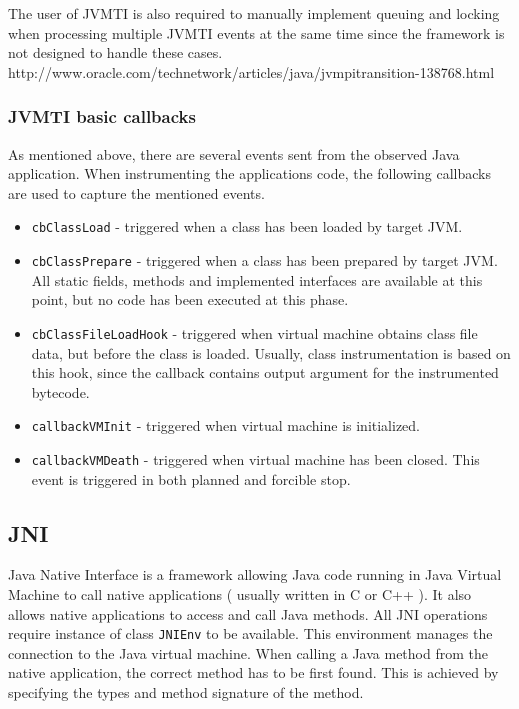 The user of JVMTI is also required to manually implement queuing and locking when processing multiple JVMTI events at the same time since the framework is not designed to handle these cases. http://www.oracle.com/technetwork/articles/java/jvmpitransition-138768.html
\subsubsection{JVMTI basic callbacks}
As mentioned above, there are several events sent from the observed Java application. When instrumenting the applications code, the following callbacks are used to capture the mentioned events.
\begin{itemize}
	\item \texttt{cbClassLoad} - triggered when a class has been loaded by target JVM.
	\item \texttt{cbClassPrepare} - triggered when a class has been prepared by target JVM. All static fields, methods and implemented interfaces are available at this point, but no code has been executed at this phase.
	\item \texttt{cbClassFileLoadHook} - triggered when virtual machine obtains class file data, but before the class is loaded. Usually, class instrumentation is based on this hook, since the callback contains output argument for the instrumented bytecode.
	\item  \texttt{callbackVMInit} - triggered when virtual machine is initialized.
	\item  \texttt{callbackVMDeath} - triggered when virtual machine has been closed. This event is triggered in both planned and forcible stop.
\end{itemize}

\subsection{JNI}
\label{JNI}
Java Native Interface is a framework allowing Java code running in Java Virtual Machine to call native applications ( usually written in C or C++ ). It also allows native applications to access and call Java methods. All JNI operations require instance of class \texttt{JNIEnv} to be available. This environment manages the connection to the Java virtual machine. When calling a Java method from the native application, the correct method has to be first found. This is achieved by specifying the types and method signature of the method.
